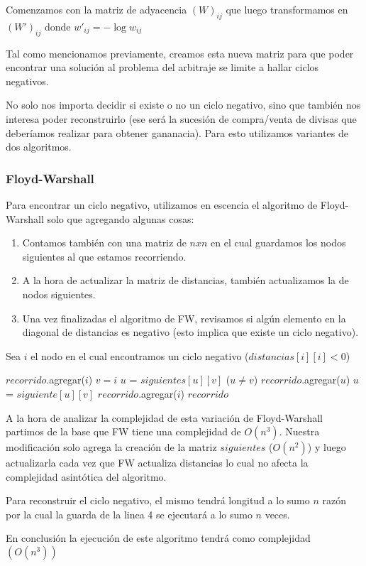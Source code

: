 \par Comenzamos con la matriz de adyacencia $(W)_{ij}$ que luego transformamos en $(W')_{ij}$ donde $w'_{ij} = - \log w_{ij}$
\par Tal como mencionamos previamente, creamos esta nueva matriz para que poder encontrar una soluci\'on al problema
del arbitraje se limite a hallar ciclos negativos.
\par No solo nos importa decidir si existe o no un ciclo negativo, sino que tambi\'en nos interesa poder reconstruirlo
(ese ser\'a la sucesi\'on de compra/venta de divisas que deber\'iamos realizar para obtener gananacia). 
Para esto utilizamos variantes de dos algoritmos.
\subsubsection{Floyd-Warshall}
Para encontrar un ciclo negativo, utilizamos en escencia el algoritmo de Floyd-Warshall solo que agregando algunas
cosas:
\begin{enumerate}
\item Contamos tambi\'en con una matriz de $nxn$ en el cual guardamos los nodos siguientes al que estamos recorriendo.
\item A la hora de actualizar la matriz de distancias, tambi\'en actualizamos la de nodos siguientes.
\item Una vez finalizadas el algoritmo de FW, revisamos si alg\'un elemento en la diagonal de distancias es negativo
(esto implica que existe un ciclo negativo).
\end{enumerate}
Sea $i$ el nodo en el cual encontramos un ciclo negativo ($distancias[i][i] < 0$)

\begin{codebox}
    \li $recorrido$.agregar($i$)
    \li $v = i$
    \li $u$ = $siguientes[u][v]$
    \li \While ($u \neq v$)
        \Then
    \li     $recorrido$.agregar($u$)
    \li     $u$ = $siguiente[u][v]$
    \End
    \li $recorrido$.agregar($i$)
    \li \Return $recorrido$
\end{codebox}

\par A la hora de analizar la complejidad de esta variaci\'on de Floyd-Warshall partimos de la base que FW tiene una complejidad
de $O(n^3)$. Nuestra modificaci\'on solo agrega la creaci\'on de la matriz $siguientes$ ($O(n^2)$) y luego actualizarla 
cada vez que FW actualiza distancias lo cual no afecta la complejidad asint\'otica del algoritmo.
\par Para reconstruir el ciclo negativo, el mismo tendr\'a longitud a lo sumo $n$ raz\'on por la cual la guarda de 
la linea 4 se ejecutar\'a a lo sumo $n$ veces.
\par En conclusi\'on la ejecuci\'on de este algoritmo tendr\'a como complejidad $(O(n^3))$

